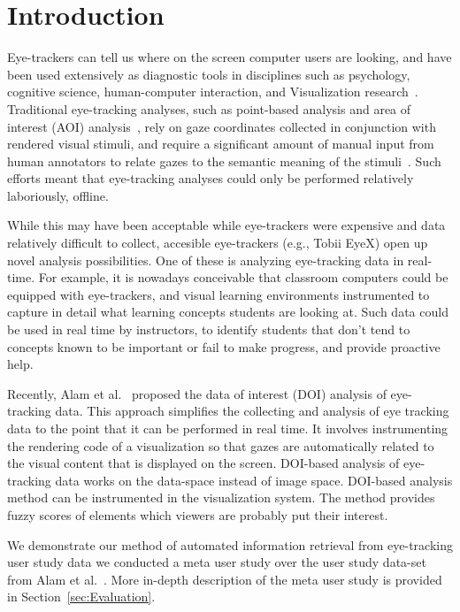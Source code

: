 \section{Introduction}

Eye-trackers can tell us where on the screen computer users are looking, and have been used extensively as diagnostic tools in disciplines such as psychology, cognitive science, human-computer interaction, and Visualization research~\cite{duchowski2002breadth}. Traditional eye-tracking analyses, such as point-based analysis and area of interest (AOI) analysis~\cite{blascheckstate}, rely on gaze coordinates collected in conjunction with rendered visual stimuli, and require a significant amount of manual input from human annotators to relate gazes to the semantic meaning of the stimuli~\cite{alamdata}. Such efforts meant that eye-tracking analyses could only be performed relatively laboriously, offline. 

While this may have been acceptable while eye-trackers were expensive and data relatively difficult to collect, accesible eye-trackers (e.g., Tobii EyeX) open up novel analysis possibilities. One of these is analyzing eye-tracking data in real-time. For example, it is nowadays conceivable that classroom computers could be equipped with eye-trackers, and visual learning environments instrumented to capture in detail what learning concepts students are looking at. Such data could be used in real time by instructors, to identify students that don’t tend to concepts known to be important or fail to make progress, and provide proactive help. 

Recently, Alam et al.~\cite{alamdata} proposed the data of interest (DOI) analysis of eye-tracking data. This approach simplifies the collecting and analysis of eye tracking data to the point that it can be performed in real time. It involves instrumenting the rendering code of a visualization so that gazes  are automatically related to the visual content that is displayed on the screen. DOI-based analysis of eye-tracking data works on the data-space instead of image space. DOI-based analysis method can be instrumented in the visualization system. The method provides fuzzy scores of elements which viewers are probably put their interest. 

We demonstrate our method of automated information retrieval from eye-tracking user study data we conducted a meta user study over the user study data-set from Alam et al.~\cite{alamdata}. More in-depth description of the meta user study is provided in Section~\ref{sec:Evaluation}. 
 
